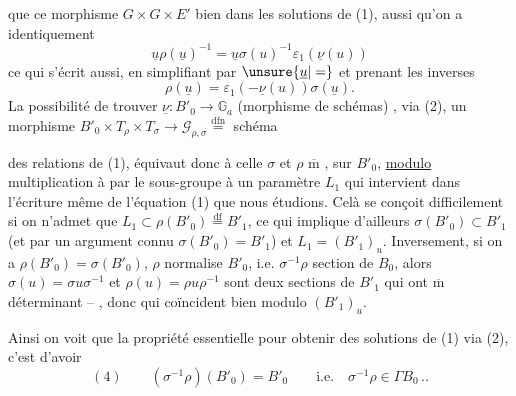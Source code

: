   que ce morphisme   $G\times G\times E'$   bien dans les solutions de (1),   aussi qu'on a identiquement
\[
\underline u\rho(\underline u)^{-1}=\underline u\sigma(u)^{-1}\varepsilon_1(\underline\nu(u))
\]
ce qui s'écrit aussi, en simplifiant par $\unsure{\underline u|=}$ et prenant les inverses
\[
\tag{3}
\rho(\underline u)=\varepsilon_1(-\underline\nu(u))\sigma(\underline u).
\]
La possibilité de trouver $\underline\nu:B'_0\longrightarrow \mathbb G_a$ (morphisme de schémas) , via (2), un morphisme $B'_0\times T_\rho\times T_\sigma\longrightarrow\mathcal G_{\rho,\sigma}\overset{\mathrm{dfn}}{=}$ schéma




des relations de (1), équivaut donc à celle
  $\sigma$ et $\rho$
 $\overline{\mathrm m}$ ,
sur $B'_0$, \uline{modulo} multiplication à  par
 le sous-groupe 
 à un paramètre $L_1$ qui
intervient dans l'écriture même de l'équation (1) que nous étudions.
Celà se conçoit difficilement si on n'admet que
$L_1\subset\rho(B'_0)\overset{\mathrm{df}}=B'_1$, ce qui implique d'ailleurs
$\sigma(B'_0)\subset B'_1$ (et par un argument connu $\sigma(B'_0)=B'_1$)
et $L_1=(B'_1)_u$. Inversement, si on a
$\rho(B'_0)=\sigma(B'_0)$, 
\deleted{$\unsure{\rho(-)}$}$\rho$ normalise $B'_0$,
 i.e. $\sigma^{-1}\rho$ section de $B_0$, alors
$\sigma(u)=\sigma u\sigma^{-1}$ et $\rho(u)=\rho u\rho^{-1}$ sont deux sections
de $B'_1$ qui ont $\overline{\mathrm m}$ déterminant -- ,
donc qui coïncident bien modulo $(B'_1)_u$.

Ainsi on voit que la propriété essentielle pour obtenir des solutions de (1) via (2),
c'est d'avoir
\[
(4)\qquad (\sigma^{-1}\rho)(B'_0)=B'_0\qquad\text{i.e.}\quad
\sigma^{-1}\rho\in\Gamma B_0\, ..
\]


